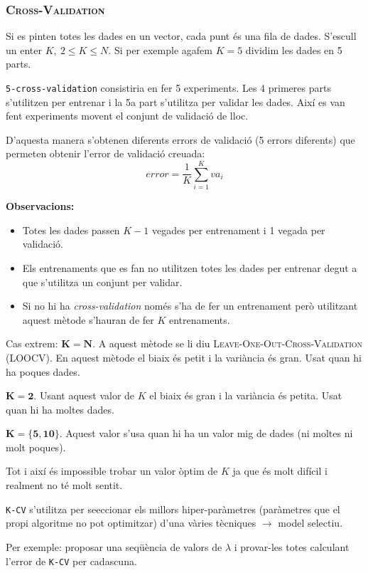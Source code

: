 \documentclass[a4paper]{article}
\begin{document}
\subsubsection{\textsc{Cross-Validation}}


Si es pinten totes les dades en un vector, cada punt és una fila de dades. S'escull un enter $K, \ 2 \le K \le N$. Si per exemple agafem $K=5$ dividim les dades en 5 parts. 

\verb|5-cross-validation| consistiria en fer 5 experiments. Les 4 primeres parts s'utilitzen per entrenar i la 5a part s'utilitza per validar les dades. Així es van fent experiments movent el conjunt de validació de lloc.

D'aquesta manera s'obtenen diferents errors de validació (5 errors diferents) que permeten obtenir l'error de validació creuada:
$$
error = \frac{1}{K} \sum_{i=1}^K va_i
$$

\textbf{Observacions:}
\begin{itemize}
	\item Totes les dades passen $K - 1$ vegades per entrenament i 1 vegada per validació.
	\item Els entrenaments que es fan no utilitzen totes les dades per entrenar degut a que s'utilitza un conjunt per validar.
	\item Si no hi ha \emph{cross-validation} només s'ha de fer un entrenament però utilitzant aquest mètode s'hauran de fer $K$ entrenaments.
\end{itemize}

Cas extrem: $\boldsymbol{K=N}$. A aquest mètode se li diu \textsc{Leave-One-Out-Cross-Validation} (LOOCV). En aquest mètode el biaix és petit i la variància és gran. Usat quan hi ha poques dades.

$\boldsymbol{K=2}$. Usant aquest valor de $K$ el biaix és gran i la variància és petita. Usat quan hi ha moltes dades.

$\boldsymbol{K=\{5,10\}}$. Aquest valor s'usa quan hi ha un valor mig de dades (ni moltes ni molt poques).

Tot i així és impossible trobar un valor òptim de $K$ ja que és molt difícil i realment no té molt sentit.

\verb|K-CV| s'utilitza per se\lgem eccionar els millors hiper-paràmetres (paràmetres que el propi algoritme no pot optimitzar) d'una vàries tècniques $\rightarrow$ model selectiu.

Per exemple: proposar una seqüència de valors de $\lambda$ i provar-les totes calculant l'error de \verb|K-CV| per cadascuna.
\end{document}
